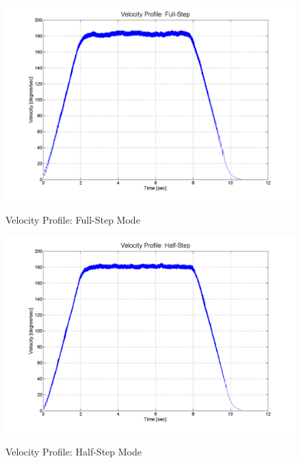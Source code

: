 \documentclass{article}
\theoremstyle{plain}
\theoremstyle{definition}
\theoremstyle{remark}
\begin{document}
\begin{figure}[h!]
\begin{center}
\includegraphics[width=12cm]{Q4_full_step.png}
\caption{Velocity Profile: Full-Step Mode} \label{tex}
\label{fig:q4_11}
\end{center}
\end{figure}

\begin{figure}[h!]
\begin{center}
\includegraphics[width=12cm]{Q4_half_step.png}
\caption{Velocity Profile: Half-Step Mode} \label{tex}
\label{fig:q4_12}
\end{center}
\end{figure}
\end{document}
